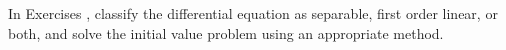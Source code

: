 {\noindent In Exercises}
{, classify the differential equation as separable, first order linear, or both, and solve the initial value problem using an appropriate method.}
